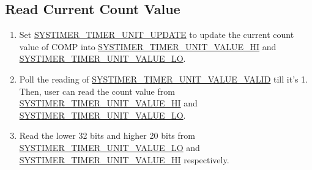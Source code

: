 \documentclass[main\_\_EN.tex]{subfiles}
\begin{document}
\subsection{Read Current Count Value}\label{sec:to-read-system-timer-value}
\begin{enumerate}
    \item Set \hyperref[fielddesc:SYSTIMERTIMERUNIT0UPDATE]{SYSTIMER\_TIMER\_UNIT\_UPDATE} to update the current count value of COMP into \hyperref[fielddesc:SYSTIMERTIMERUNIT0VALUEHI]{SYSTIMER\_TIMER\_UNIT\_VALUE\_HI} and \hyperref[fielddesc:SYSTIMERTIMERUNIT0VALUELO]{SYSTIMER\_TIMER\_UNIT\_VALUE\_LO}.
    \item Poll the reading of \hyperref[fielddesc:SYSTIMERTIMERUNIT0VALUEVALID]{SYSTIMER\_TIMER\_UNIT\_VALUE\_VALID} till it's 1. Then, user can read the count value from \hyperref[fielddesc:SYSTIMERTIMERUNIT0VALUEHI]{SYSTIMER\_TIMER\_UNIT\_VALUE\_HI} and \hyperref[fielddesc:SYSTIMERTIMERUNIT0VALUELO]{SYSTIMER\_TIMER\_UNIT\_VALUE\_LO}.
    \item Read the lower 32 bits and higher 20 bits from \hyperref[fielddesc:SYSTIMERTIMERUNIT0VALUELO]{SYSTIMER\_TIMER\_UNIT\_VALUE\_LO} and \hyperref[fielddesc:SYSTIMERTIMERUNIT0VALUEHI]{SYSTIMER\_TIMER\_UNIT\_VALUE\_HI} respectively.
\end{enumerate}
\end{document}
